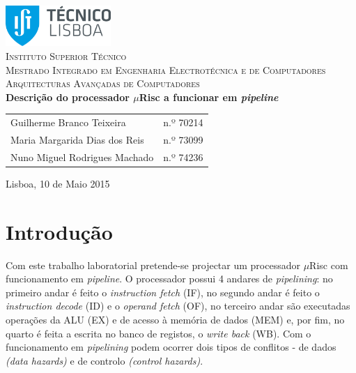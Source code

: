 \documentclass[11pt]{article}
\numberwithin{equation}{section}
\begin{document}
\begin{titlepage}
\begin{center}

\hfill \break
\hfill \break

\includegraphics[width=0.3\textwidth]{./logo}~\\[1cm]

\textsc{\LARGE Instituto Superior Técnico}\\[0.25cm]
\textsc{\Large Mestrado Integrado em Engenharia Electrotécnica e de Computadores}\\[1.8cm]
\textsc{\huge Arquitecturas Avançadas de Computadores}\\[0.25cm]

{\huge \bfseries Descrição do processador $\mu$Risc a funcionar em \textit{pipeline}\\[1.2cm]}

\begin{tabular}{ l l }
Guilherme Branco Teixeira & \hspace{2mm} n.º 70214 \\ 
Maria Margarida Dias dos Reis & \hspace{2mm} n.º 73099 \\
Nuno Miguel Rodrigues Machado & \hspace{2mm} n.º 74236 
\end{tabular}

\vfill

{\large Lisboa, 10 de Maio 2015} 

\end{center}
\end{titlepage}
 
\clearpage

\tableofcontents
\pagebreak

\clearpage
{}

\section{Introdução}

Com este trabalho laboratorial pretende-se projectar um processador $\mu$Risc com funcionamento em \textit{pipeline}. O processador possui 4 andares de \textit{pipelining}: no primeiro andar é feito o \textit{instruction fetch} (IF), no segundo andar é feito o \textit{instruction decode} (ID) e o \textit{operand fetch} (OF), no terceiro andar são executadas operações da ALU (EX) e de acesso à memória de dados (MEM) e, por fim, no quarto é feita a escrita no banco de registos, o \textit{write back }(WB). Com o funcionamento em \textit{pipelining} podem ocorrer dois tipos de conflitos - de dados \textit{(data hazards)} e de controlo \textit{(control hazards)}. 
 
\end{document}
